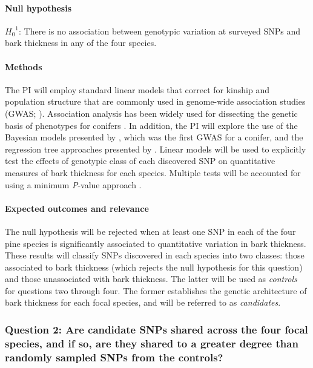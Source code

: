 \paragraph{Null hypothesis} ${H_0}^1$: There is no association between genotypic variation at surveyed SNPs and bark thickness 
in any of the four species.

\paragraph{Methods} The PI will employ standard linear models that correct for kinship and population structure that are 
commonly used in genome-wide association studies (GWAS; \citet{Yu:2006ij}). Association analysis has been widely 
used for dissecting the genetic basis of phenotypes for conifers \citep{Neale:2011jh, Ingvarsson:2011fg}. 
In addition, the PI will explore the use of the Bayesian models presented by \citet{Parchman:2012ca}, which 
was the first GWAS for a conifer, and the regression tree approaches presented by \citet{Holliday:2012fz}. 
Linear models will be used to explicitly test the effects of genotypic class of each discovered SNP on quantitative 
measures of bark thickness for each species.  Multiple tests will be accounted for using a minimum \emph{P}-value approach 
\citep{Conneely:2007ga}.

\paragraph{Expected outcomes and relevance} The null hypothesis will be rejected when at least one SNP in each 
of the four pine species is significantly associated to quantitative variation in bark thickness. These results will classify 
SNPs discovered in each species into two classes: those associated to bark thickness 
(which rejects the null hypothesis for this question) and those unassociated with 
bark thickness. The latter will be used as \emph{controls} for questions two through four. The former establishes the 
genetic architecture of bark thickness for each focal species, and will be referred to as \emph{candidates}.

\subsubsection*{Question 2: Are candidate SNPs shared across the four focal species, and if so, are they shared to a 
greater degree than randomly sampled SNPs from the controls?}


